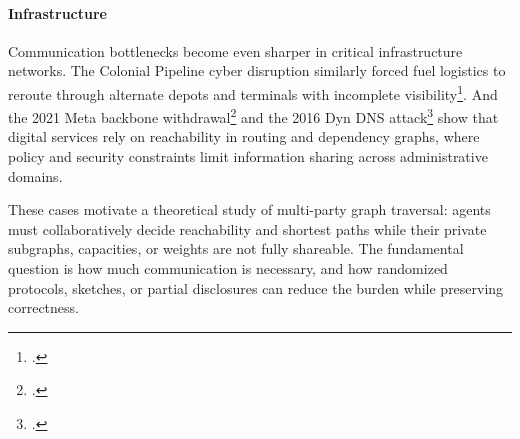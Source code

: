\paragraph{Infrastructure} Communication bottlenecks become even sharper in critical infrastructure networks. The Colonial Pipeline cyber disruption similarly forced fuel logistics to reroute through alternate depots and terminals with incomplete visibility\footcite{crs_colonial_pipeline_2021}. And the 2021 Meta backbone withdrawal\footcite{cloudflare_facebook_outage_2021} and the 2016 Dyn DNS attack\footcite{deec66cadd6f410aac1f78a555982100} show that digital services rely on reachability in routing and dependency graphs, where policy and security constraints limit information sharing across administrative domains.

These cases motivate a theoretical study of multi-party graph traversal: agents must collaboratively decide reachability and shortest paths while their private subgraphs, capacities, or weights are not fully shareable. The fundamental question is how much communication is necessary, and how randomized protocols, sketches, or partial disclosures can reduce the burden while preserving correctness.